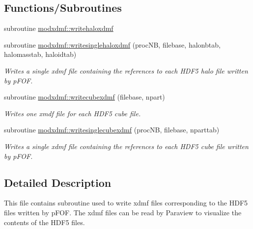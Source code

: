 \subsection*{Functions/\+Subroutines}
\begin{DoxyCompactItemize}
\item 
subroutine \hyperlink{namespacemodxdmf_ae2f7d2597902a070b71c0f7e57a1fd94}{modxdmf\+::writehaloxdmf}
\item 
subroutine \hyperlink{namespacemodxdmf_ab794d1f6abf632c9ff4279bec51e13b1}{modxdmf\+::writesinglehaloxdmf} (proc\+NB, filebase, halonbtab, halomasstab, haloidtab)
\begin{DoxyCompactList}\small\item\em Writes a single xdmf file containing the references to each H\+D\+F5 halo file written by p\+F\+OF. \end{DoxyCompactList}\item 
subroutine \hyperlink{namespacemodxdmf_a72e8949508c9724a4993f8f43447a1ea}{modxdmf\+::writecubexdmf} (filebase, npart)
\begin{DoxyCompactList}\small\item\em Writes one xmdf file for each H\+D\+F5 cube file. \end{DoxyCompactList}\item 
subroutine \hyperlink{namespacemodxdmf_ae843cb42b7f4598f934c91195facf470}{modxdmf\+::writesinglecubexdmf} (proc\+NB, filebase, nparttab)
\begin{DoxyCompactList}\small\item\em Writes a single xdmf file containing the references to each H\+D\+F5 cube file written by p\+F\+OF. \end{DoxyCompactList}\end{DoxyCompactItemize}


\subsection{Detailed Description}
This file contains subroutine used to write xdmf files corresponding to the H\+D\+F5 files written by p\+F\+OF. The xdmf files can be read by Paraview to visualize the contents of the H\+D\+F5 files. 

